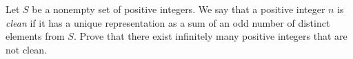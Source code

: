 Let $S$ be a nonempty set of positive integers. We say that a positive integer $n$ is \emph{clean} if it has a unique representation as a sum of an odd number of distinct elements from $S$. Prove that there exist infinitely many positive integers that are not clean.
